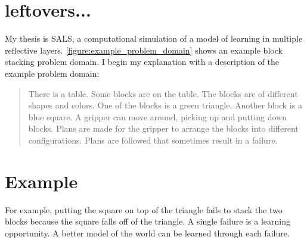 \section{leftovers...}

My thesis is SALS, a computational simulation of a model of learning
in multiple reflective layers.
\autoref{figure:example_problem_domain} shows an example block
stacking problem domain.  I begin my explanation with a description of
the example problem domain:
\begin{quote}
There is a table.  Some blocks are on the table.  The blocks are of
different shapes and colors.  One of the blocks is a green triangle.
Another block is a blue square.  A gripper can move around, picking up
and putting down blocks.  Plans are made for the gripper to arrange
the blocks into different configurations.  Plans are followed that
sometimes result in a failure.
\end{quote}


\section{Example}

For example, putting the square on top of the triangle fails to stack
the two blocks because the square falls off of the triangle.  A single
failure is a learning opportunity.  A better model of the world can be
learned through each failure.


